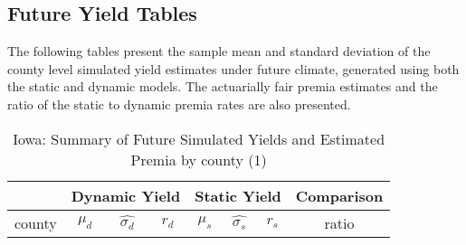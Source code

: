 \subsection{Future Yield Tables}

The following tables present the sample mean and standard deviation of the county level simulated yield estimates under future climate, generated using both the static and dynamic models. The actuarially fair premia estimates and the ratio of the static to dynamic premia rates are also presented.

\begin{table}[H]\centering
\caption{Iowa: Summary of Future Simulated Yields and Estimated Premia by county (1)}
\label{my-label}
\begin{tabular}{|c|ccc|ccc|c|}

\hline
\multicolumn{1}{|c}{} & \multicolumn{3}{|c}{Dynamic Yield} & \multicolumn{3}{|c}{Static Yield} & \multicolumn{1}{|c|}{Comparison}\\ 
\hline
county        & $\mu_d$ & $\hat{\sigma_d}$ & $r_d$ & $\mu_s$ & $\hat{\sigma_s}$ & $r_s$ & ratio \\
\hline



\end{tabular}
\end{table}
